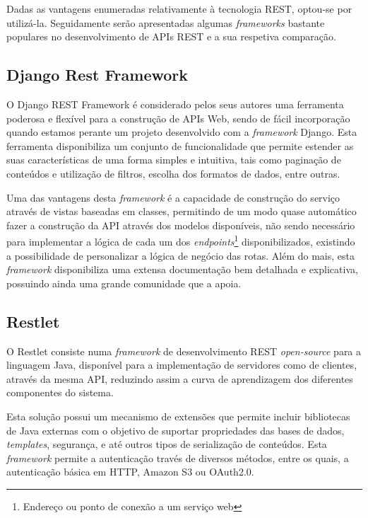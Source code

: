 Dadas as vantagens enumeradas relativamente à tecnologia \ac{REST}, optou-se por utilizá-la. Seguidamente serão apresentadas algumas \textit{frameworks} bastante populares no desenvolvimento de APIs \ac{REST} e a sua respetiva comparação. 



\subsection{Django Rest Framework}



O Django REST Framework é considerado pelos seus autores uma ferramenta poderosa e flexível para a construção de APIs Web\cite{restdjango}, sendo de fácil incorporação quando estamos perante um projeto desenvolvido com a \textit{framework} Django. Esta ferramenta disponibiliza um conjunto de funcionalidade que permite estender as suas características de uma forma simples e intuitiva, tais como paginação de conteúdos e utilização de filtros, escolha dos formatos de dados, entre outras.


Uma das vantagens desta \textit{framework} é a capacidade de construção do serviço através de vistas baseadas em classes, permitindo de um modo quase automático fazer a construção da API através dos modelos disponíveis, não sendo necessário para implementar a lógica de cada um dos \textit{endpoints}\footnote{Endereço ou ponto de conexão a um serviço web} disponibilizados, existindo a possibilidade de personalizar a lógica de negócio das rotas. Além do mais, esta \textit{framework} disponibiliza uma extensa documentação bem detalhada e explicativa, possuindo ainda uma grande comunidade que a apoia. 












\subsection{Restlet}

O Restlet consiste numa \textit{framework} de desenvolvimento \ac{REST} \textit{open-source} para a linguagem Java, disponível para a implementação de servidores como de clientes, através da mesma \ac{API}, reduzindo assim a curva de aprendizagem dos diferentes componentes do sistema. 

Esta solução possui um mecanismo de extensões que permite incluir bibliotecas de Java externas com o objetivo de suportar propriedades das bases de dados, \textit{templates}, segurança, e até outros tipos de serialização de conteúdos. Esta \textit{framework} permite a autenticação través de diversos métodos, entre os quais, a autenticação básica em \ac{HTTP}, Amazon S3 ou OAuth2.0.

